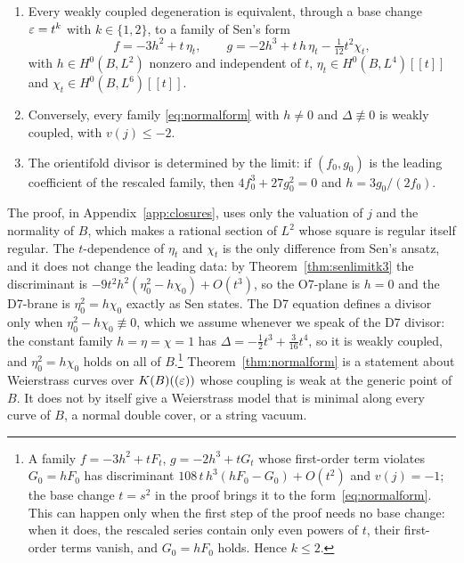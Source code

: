\begin{theorem}\label{thm:normalform}
\begin{enumerate}[label=(\roman*),leftmargin=2em]
\item Every weakly coupled degeneration is equivalent, through a base change $\varepsilon=t^k$ with $k\in\{1,2\}$, to a family of Sen's form
\begin{equation}\label{eq:normalform}
f=-3h^2+t\,\eta_t,\qquad g=-2h^3+t\,h\,\eta_t-\tfrac1{12}t^2\chi_t,
\end{equation}
with $h\in H^0(B,L^2)$ nonzero and independent of $t$, $\eta_t\in H^0(B,L^4)[[t]]$ and $\chi_t\in H^0(B,L^6)[[t]]$.
\item Conversely, every family \eqref{eq:normalform} with $h\ne0$ and $\Delta\not\equiv0$ is weakly coupled, with $v(j)\le-2$.
\item The orientifold divisor is determined by the limit: if $(f_0,g_0)$ is the leading coefficient of the rescaled family, then $4f_0^3+27g_0^2=0$ and $h=3g_0/(2f_0)$.
\end{enumerate}
\end{theorem}

The proof, in Appendix~\ref{app:closures}, uses only the valuation of $j$ and the normality of $B$, which makes a rational section of $L^2$ whose square is regular itself regular. The $t$-dependence of $\eta_t$ and $\chi_t$ is the only difference from Sen's ansatz, and it does not change the leading data: by Theorem~\ref{thm:senlimitk3} the discriminant is $-9t^2h^2(\eta_0^2-h\chi_0)+O(t^3)$, so the O7-plane is $h=0$ and the D7-brane is $\eta_0^2=h\chi_0$ exactly as Sen states. The D7 equation defines a divisor only when $\eta_0^2-h\chi_0\not\equiv0$, which we assume whenever we speak of the D7 divisor: the constant family $h=\eta=\chi=1$ has $\Delta=-\tfrac12t^3+\tfrac3{16}t^4$, so it is weakly coupled, and $\eta_0^2=h\chi_0$ holds on all of $B$.\footnote{A family $f=-3h^2+tF_t$, $g=-2h^3+tG_t$ whose first-order term violates $G_0=hF_0$ has discriminant $108\,t\,h^3(hF_0-G_0)+O(t^2)$ and $v(j)=-1$; the base change $t=s^2$ in the proof brings it to the form~\eqref{eq:normalform}. This can happen only when the first step of the proof needs no base change: when it does, the rescaled series contain only even powers of $t$, their first-order terms vanish, and $G_0=hF_0$ holds. Hence $k\le2$.} Theorem~\ref{thm:normalform} is a statement about Weierstrass curves over $K(B)((\varepsilon))$ whose coupling is weak at the generic point of $B$. It does not by itself give a Weierstrass model that is minimal along every curve of $B$, a normal double cover, or a string vacuum.

